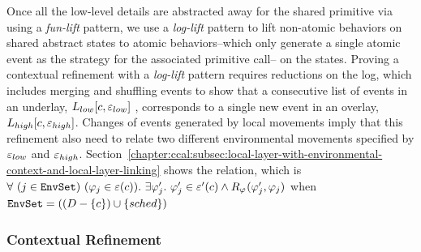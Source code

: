 Once all the low-level details are abstracted away for the shared primitive via using a \textit{fun-lift} pattern, we use a \textit{log-lift} pattern to lift non-atomic behaviors on shared abstract states to atomic behaviors--which only generate a single atomic event as the strategy for the associated primitive call-- on the states. 
Proving a contextual refinement with a \textit{log-lift} pattern requires reductions on the log, 
which includes merging and shuffling events to show 
that a consecutive list of  events in an underlay, $L_{low}[c, {\varepsilon}_{low}]$ , corresponds to a single new event in an overlay, 
$L_{high}[c, {\varepsilon}_{high}]$.  Changes of events generated by local movements
imply that this refinement also need to relate two different environmental movements specified by ${\varepsilon}_{low}$ and ${\varepsilon}_{high}$.
Section~\ref{chapter:ccal:subsec:local-layer-with-environmental-context-and-local-layer-linking} shows the relation,
which is $\forall\ (j \in \codeinmath{EnvSet})\ 
(\strat{j} \in \oracle(c)) .\ \exists \stratp{j} . \ \stratp{j} \in \oracle'(c) \wedge R_{\strat{}}(\stratp{j}, \strat{j})$ when 
${\mathrm{\texttt{EnvSet}}} = ((D - \{ c\}) \cup \{ sched\})$


\subsubsection{Contextual Refinement}

